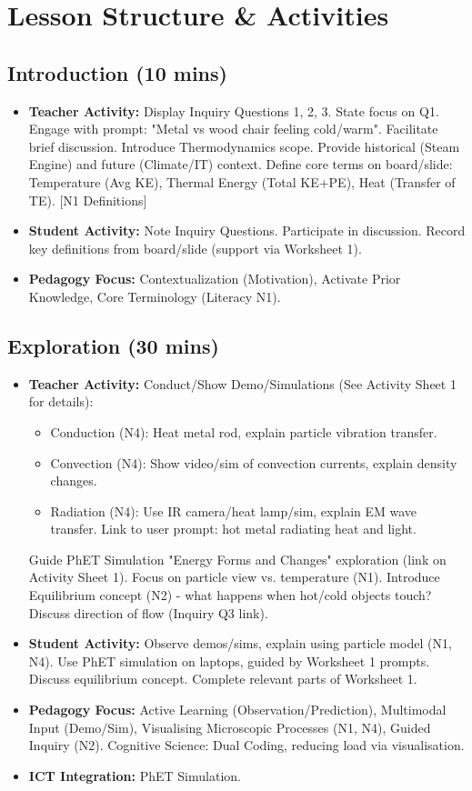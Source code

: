 \documentclass[11pt, a4paper]{article}
\begin{document}
\section*{Lesson Structure \& Activities}

\subsection*{Introduction (10 mins)}
\begin{itemize}
    \item \textbf{Teacher Activity:} Display Inquiry Questions 1, 2, 3. State focus on Q1. Engage with prompt: "Metal vs wood chair feeling cold/warm". Facilitate brief discussion. Introduce Thermodynamics scope. Provide historical (Steam Engine) and future (Climate/IT) context. Define core terms on board/slide: Temperature (Avg KE), Thermal Energy (Total KE+PE), Heat (Transfer of TE). [N1 Definitions]
    \item \textbf{Student Activity:} Note Inquiry Questions. Participate in discussion. Record key definitions from board/slide (support via Worksheet 1).
    \item \textbf{Pedagogy Focus:} Contextualization (Motivation), Activate Prior Knowledge, Core Terminology (Literacy N1).
\end{itemize}

\subsection*{Exploration (30 mins)}
\begin{itemize}
    \item \textbf{Teacher Activity:} Conduct/Show Demo/Simulations (See Activity Sheet 1 for details):
        \begin{itemize}
            \item Conduction (N4): Heat metal rod, explain particle vibration transfer.
            \item Convection (N4): Show video/sim of convection currents, explain density changes.
            \item Radiation (N4): Use IR camera/heat lamp/sim, explain EM wave transfer. Link to user prompt: hot metal radiating heat and light.
        \end{itemize}
        Guide PhET Simulation "Energy Forms and Changes" exploration (link on Activity Sheet 1). Focus on particle view vs. temperature (N1). Introduce Equilibrium concept (N2) - what happens when hot/cold objects touch? Discuss direction of flow (Inquiry Q3 link).
    \item \textbf{Student Activity:} Observe demos/sims, explain using particle model (N1, N4). Use PhET simulation on laptops, guided by Worksheet 1 prompts. Discuss equilibrium concept. Complete relevant parts of Worksheet 1.
    \item \textbf{Pedagogy Focus:} Active Learning (Observation/Prediction), Multimodal Input (Demo/Sim), Visualising Microscopic Processes (N1, N4), Guided Inquiry (N2). Cognitive Science: Dual Coding, reducing load via visualisation.
    \item \textbf{ICT Integration:} PhET Simulation.
\end{itemize}
\end{document}
